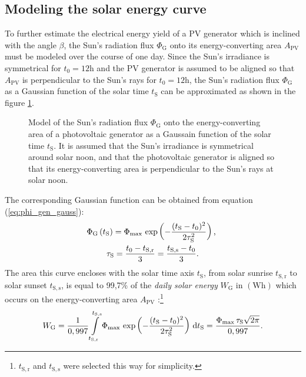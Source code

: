 \subsection{Modeling the solar energy curve} \label{sec:solar_energy_curve}
To further estimate the electrical energy yield of a PV generator which is inclined with the angle $\beta$, the Sun's radiation flux $\Phi_{\mathrm{G}}$ onto its energy-converting area $A_{\mathrm{PV}}$ must be modeled over the course of one day. Since the Sun's irradiance is symmetrical for $t_0 = 12\mathrm{h}$ and the PV generator is assumed to be aligned so that $A_{\mathrm{PV}}$ is perpendicular to the Sun's rays for $t_0 = 12\mathrm{h}$, the Sun's radiation flux $\Phi_{\mathrm{G}}$ as a Gaussian function of the solar time $t_{\mathrm{S}}$ can be approximated as shown in the figure \ref{fig:tikz_energy_gauss}.
\begin{figure}[h!]
	\centering
	
	\caption{Model of the Sun's radiation flux $\Phi_{\mathrm{G}}$ onto the energy-converting area of a photovoltaic generator as a Gaussain function of the solar time $t_{\mathrm{S}}$. It is assumed that the Sun's irradiance is symmetrical around solar noon, and that the photovoltaic generator is aligned so that its energy-converting area is perpendicular to the Sun's rays at solar noon.}
	\label{fig:tikz_energy_gauss}
\end{figure}
The corresponding Gaussian function can be obtained from equation (\ref{eq:phi_gen_gauss}):
	\begin{equation} \label{eq:phi_gen_gauss}
	\centering
		\begin{gathered}
		\Phi_{\mathrm{G}}\left(t_{\mathrm{S}}\right) = \Phi_{\mathrm{max}} \, \exp\left(-\frac{(t_{\mathrm{S}} - t_0)^2}{2 \tau_\mathrm{S}^2}\right) \text{, } 
		\\
		\tau_\mathrm{S} = \frac{t_0 - t_{\mathrm{S,r}}}{3} = \frac{t_{\mathrm{S,s}} - t_0}{3} \text{.}
		\end{gathered}
	\end{equation}
The area this curve encloses with the solar time axis $t_{\mathrm{S}}$, from solar sunrise $t_{\mathrm{S,r}}$ to solar sunset $t_{\mathrm{S,s}}$, is equal to 99,7\% of the \emph{daily solar energy} $W_{\mathrm{G}}$ in $\left(\mathrm{Wh}\right)$ which occurs on the energy-converting area $A_{\mathrm{PV}}$ \cite{Landis:1995, Prechtl:2006, Prechtl:2008, Glover:2010, Schrufer:2014, AlNahhal:2019}:\footnote{$t_{\mathrm{S,r}}$ and $t_{\mathrm{S,s}}$ were selected this way for simplicity.}
	\begin{equation} \label{eq:w_gen_gauss}
	\centering
		W_\mathrm{G} = \frac{1}{0,997} \int\limits_{t_{\mathrm{S,r}}}^{t_{\mathrm{S,s}}} \Phi_{\mathrm{max}} \, \exp\left(-\frac{(t_{\mathrm{S}} - t_0)^2}{2 \tau_\mathrm{S}^2}\right) \,\mathrm{d}t_\mathrm{S} = \frac{\Phi_{\mathrm{max}} \, \tau_\mathrm{S} \sqrt{2\pi}}{0,997} \text{.}
	\end{equation}


